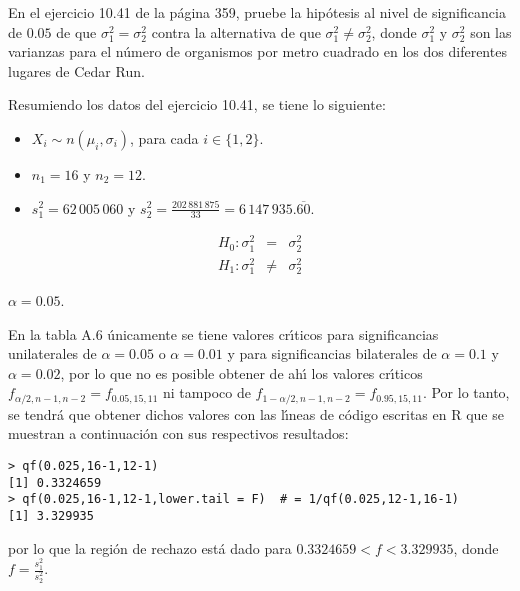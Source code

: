 \begin{enunciado}
 En el ejercicio 10.41 de la p\'agina 359, pruebe la hip\'otesis
 al nivel de significancia de $0.05$ de que $\sigma_1^2 = \sigma_2^2$
 contra la alternativa de que $\sigma_1^2 \neq \sigma_2^2$,
 donde $\sigma_1^2$ y $\sigma_2^2$ son las varianzas
 para el n\'umero de organismos por metro cuadrado
 en los dos diferentes lugares de Cedar Run.
\end{enunciado}

\begin{solucion}
 Resumiendo los datos del ejercicio 10.41, se tiene lo siguiente:
 \begin{itemize}
  \item $X_i \sim n\left( \mu_i, \sigma_i \right)$,
  para cada $i \in \{ 1,2 \}$.
  \item $n_1 = 16$ y $n_2 = 12$.
  \item $s_1^2 = 62\,005\,060$
  y $s_2^2 = \frac{202\,881\,875}{33} = 6\,147\,935.\overline{60}$.
 \end{itemize}

 \begin{hipotesis}
  \begin{eqnarray*}
   H_0: \sigma_1^2 &  =   & \sigma_2^2 \\
   H_1: \sigma_1^2 & \neq & \sigma_2^2
  \end{eqnarray*}
 \end{hipotesis}

 \begin{significancia}
  $\alpha = 0.05$.
 \end{significancia}

 \begin{region}
  En la tabla A.6 \'unicamente se tiene valores cr\'{\i}ticos
  para significancias unilaterales de $\alpha=0.05$ o $\alpha=0.01$
  y para significancias bilaterales de $\alpha=0.1$ y $\alpha=0.02$,
  por lo que no es posible obtener de ah\'{\i} los valores cr\'{\i}ticos
  $f_{\alpha/2,n-1,n-2}=f_{0.05,15,11}$
  ni tampoco de $f_{1-\alpha/2,n-1,n-2}=f_{0.95,15,11}$.
  Por lo tanto, se tendr\'a que obtener dichos valores
  con las l\'{\i}neas de c\'odigo escritas en R
  que se muestran a continuaci\'on con sus respectivos resultados:
  \begin{verbatim}
> qf(0.025,16-1,12-1)
[1] 0.3324659
> qf(0.025,16-1,12-1,lower.tail = F)  # = 1/qf(0.025,12-1,16-1)
[1] 3.329935
  \end{verbatim}
  \vspace{-0.5cm}
  por lo que la regi\'on de rechazo est\'a dado
  para $0.3324659 < f < 3.329935$, donde $f = \frac{s_1^2}{s_2^2}$.
 \end{region}


\end{solucion}
